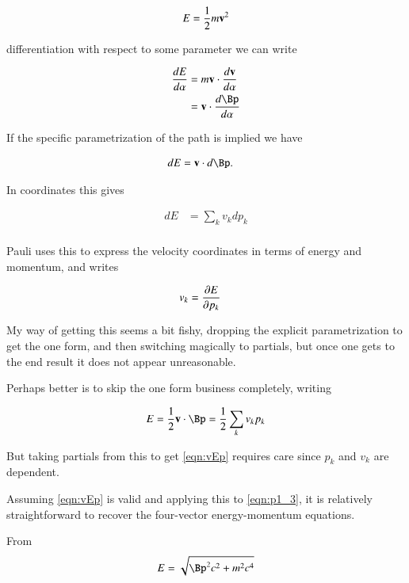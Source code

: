 \begin{align*}
E &= \inv{2} m \Bv^2 \\
\end{align*}

differentiation with respect to some parameter we can write

\begin{align*}
\frac{dE}{d\alpha} 
&= m \Bv \cdot \frac{d\Bv}{d\alpha} \\
&= \Bv \cdot \frac{d\Bp}{d\alpha} \\
\end{align*}

If the specific parametrization of the path is implied we have

\begin{align}\label{eqn:EvP}
{dE} &= \Bv \cdot {d\Bp}.
\end{align}

In coordinates this gives

\begin{align*}
{dE} &= \sum_k v_k dp_k \\
\end{align*}

Pauli uses this to express the velocity coordinates in terms of energy and momentum, and writes

\begin{align}\label{eqn:vEp}
v_k &= \PD{p_k}{E}
\end{align}

My way of getting this seems a bit fishy, dropping the explicit parametrization to get the one form, and then switching magically to partials, but once one gets to the end result it does not appear unreasonable.

Perhaps better is to skip the one form business completely, writing

\begin{align*}
E = \inv{2} \Bv \cdot \Bp = \inv{2} \sum_k v_k p_k
\end{align*}

But taking partials from this to get \ref{eqn:vEp} requires care since $p_k$ and $v_k$ are dependent.

Assuming \ref{eqn:vEp} is valid and applying this to \ref{eqn:p1_3}, it is relatively straightforward to
recover the four-vector energy-momentum equations.  

From
\begin{align*}
E &= \sqrt{\Bp^2 c^2 + m^2 c^4 } \\
\end{align*}

